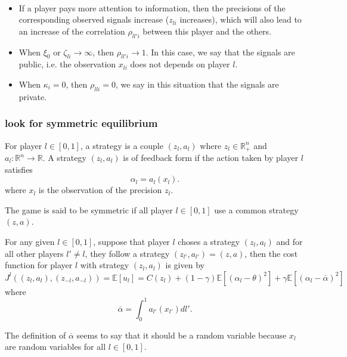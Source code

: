 \begin{remark}\ 
	\begin{itemize}
		\item If a player pays more attention to information, then the precisions of the corresponding observed signals increase ($z_{li}$ increases), which will also lead to an increase of the correlation $\rho_{ll'i}$ between this player and the others.
		\item When $\xi_0$ or $\zeta_{li} \to \infty$, then $\rho_{ll' i}  \to 1$. In this case, we say that the signals are public, i.e. the observation $x_{li}$ does not depends on player $l$.
		\item When $\kappa_i = 0$, then $\rho_{lli} =0$, we say in this situation that the signals are private.
	\end{itemize}
\end{remark}


\subsubsection{look for symmetric equilibrium}

\begin{definition}
For player $l\in [0,1]$, a strategy is a couple $(z_l ,a_l)$ where $z_l \in \mathbb{R}^n_+$ and $a_l : \mathbb{R}^n \to \mathbb{R}$. A strategy $(z_l, a_l)$ is of feedback form if the action taken by player $l$ satisfies
$$
	\alpha_l = a_l(x_l). 
$$
where $x_l$ is the observation of the precision $z_l$.
\end{definition}

\begin{definition}
	The game is said to be symmetric if all player $l \in [0,1]$ use a common strategy $(z, a)$.
\end{definition}

For any given $l \in [0,1]$, suppose that player $l$ choses a strategy $(z_l,a_l)$ and for all other players $l' \neq l$, they follow a strategy $(z_{l'}, a_{l'}) = (z,a)$, then the cost function for player $l$ with strategy $(z_l, a_l)$ is given by
$$
	J^l( (z_l, a_l), (z_{-l}, a_{-l}) ) = \mathbb{E}[u_l] = C(z_l) + (1-\gamma) \mathbb{E}[(\alpha_l - \theta)^2] + \gamma \mathbb{E}[ (\alpha_l - \overline{\alpha})^2]
$$
where
$$
	\overline{\alpha} = \int_{0}^1 a_{l'}(x_{l'}) dl'.
$$

\begin{remark}
	The definition of $\overline{\alpha}$ seems to say that it should be a random variable because $x_l$ are random variables for all $l \in [0,1]$.
\end{remark}

